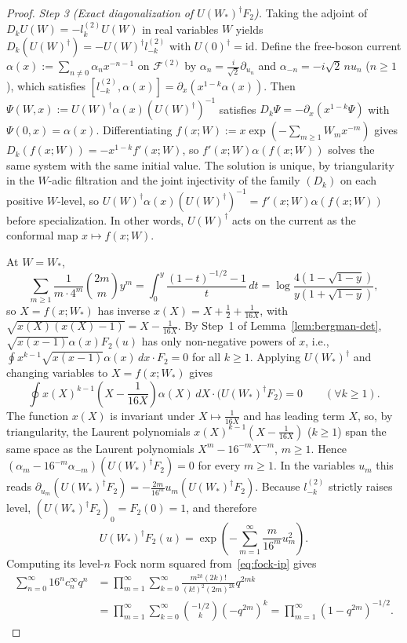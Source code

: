 \documentclass[twoside,10pt]{article}
\numberwithin{equation}{section}
\theoremstyle{slbody}
\theoremstyle{definition}
\theoremstyle{remark}
\begin{document}
\begin{proof}
\emph{Step 3 (Exact diagonalization of \(U(W_*)^\dagger F_2\)).}  Taking
the adjoint of \(D_kU(W)=-l_k^{(2)}U(W)\) in real variables \(W\) yields
\(D_k(U(W)^\dagger)=-U(W)^\dagger l_{-k}^{(2)}\) with
\(U(0)^\dagger=\mathrm{id}\).  Define the free-boson current
\(\alpha(x):=\sum_{n\neq0}\alpha_n x^{-n-1}\) on \(\mathcal F^{(2)}\) by
\(\alpha_n=\frac{i}{\sqrt2}\partial_{u_n}\) and
\(\alpha_{-n}=-i\sqrt2\,n u_n\) (\(n\geq1\)), which satisfies
\([l_{-k}^{(2)},\alpha(x)]=\partial_x(x^{1-k}\alpha(x))\).  Then
\(\Psi(W,x):=U(W)^\dagger\alpha(x)(U(W)^\dagger)^{-1}\) satisfies
\(D_k\Psi=-\partial_x(x^{1-k}\Psi)\) with \(\Psi(0,x)=\alpha(x)\).  Differentiating
\(f(x;W):=x\exp(-\sum_{m\geq1}W_m x^{-m})\) gives
\(D_k(f(x;W))=-x^{1-k}f'(x;W)\), so \(f'(x;W)\alpha(f(x;W))\) solves the
same system with the same initial value.  The solution is unique, by
triangularity in the \(W\)-adic filtration and the joint injectivity of the
family \((D_k)\) on each positive \(W\)-level,
so \(U(W)^\dagger\alpha(x)(U(W)^\dagger)^{-1}=f'(x;W)\alpha(f(x;W))\) before
specialization.  In other words, \(U(W)^\dagger\) acts on the current as the
conformal map \(x\mapsto f(x;W)\).

At \(W=W_*\),
\[
 \sum_{m\geq1}\frac{1}{m\cdot 4^m}\binom{2m}{m}y^m
 =\int_0^y\frac{(1-t)^{-1/2}-1}{t}\,dt
 =\log\frac{4(1-\sqrt{1-y})}{y(1+\sqrt{1-y})},
\]
so \(X=f(x;W_*)\) has inverse \(x(X)=X+\frac12+\frac{1}{16X}\), with
\(\sqrt{x(X)(x(X)-1)}=X-\frac{1}{16X}\).  By Step~1 of
Lemma~\ref{lem:bergman-det}, \(\sqrt{x(x-1)}\alpha(x)F_2(u)\) has only
non-negative powers of \(x\), i.e.,
\(\oint x^{k-1}\sqrt{x(x-1)}\alpha(x)\,dx\cdot F_2=0\) for all \(k\geq1\).
Applying \(U(W_*)^\dagger\) and changing variables to \(X=f(x;W_*)\) gives
\[
 \oint x(X)^{k-1}\!\left(X-\frac{1}{16X}\right)\alpha(X)\,dX\cdot\bigl(U(W_*)^\dagger F_2\bigr)=0
 \qquad(\forall k\geq1).
\]
The function \(x(X)\) is invariant under \(X\mapsto\frac{1}{16X}\) and has
leading term \(X\), so, by triangularity, the Laurent polynomials
\(x(X)^{k-1}(X-\frac{1}{16X})\) (\(k\geq1\)) span the same space as the
Laurent polynomials \(X^m-16^{-m}X^{-m}\), \(m\geq1\).  Hence
\((\alpha_m-16^{-m}\alpha_{-m})(U(W_*)^\dagger F_2)=0\) for every \(m\geq1\).
In the variables \(u_m\) this reads
\(\partial_{u_m}(U(W_*)^\dagger F_2)=-\frac{2m}{16^m}u_m(U(W_*)^\dagger F_2)\).  Because \(l_{-k}^{(2)}\) strictly raises level,
\((U(W_*)^\dagger F_2)_0=F_2(0)=1\), and therefore
\[
 U(W_*)^\dagger F_2(u)=\exp\!\left(-\sum_{m=1}^\infty\frac{m}{16^m}u_m^2\right).
\]
Computing its level-\(n\) Fock norm squared from~\eqref{eq:fock-ip} gives
\begin{align*}
 \sum_{n=0}^\infty 16^n c_n^\infty q^n
 &=\prod_{m=1}^\infty\sum_{k=0}^\infty\frac{m^{2k}(2k)!}{(k!)^2(2m)^{2k}}q^{2mk}\\
 &=\prod_{m=1}^\infty\sum_{k=0}^\infty\binom{-1/2}{k}(-q^{2m})^k
  =\prod_{m=1}^\infty(1-q^{2m})^{-1/2}.
\end{align*}


\end{proof}
\end{document}
